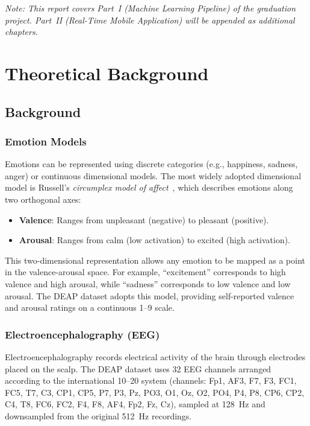 \documentclass[12pt,a4paper]{report}
\begin{document}
\noindent\textit{Note: This report covers Part~I (Machine Learning Pipeline)
of the graduation project. Part~II (Real-Time Mobile Application) will be
appended as additional chapters.}


\chapter{Theoretical Background}
\label{ch:background}

\section{Background}
\label{sec:bg}

\subsection{Emotion Models}

Emotions can be represented using discrete categories (e.g., happiness, sadness,
anger) or continuous dimensional models. The most widely adopted dimensional
model is Russell's \textit{circumplex model of affect}~\cite{russell1980}, which
describes emotions along two orthogonal axes:

\begin{itemize}[noitemsep]
    \item \textbf{Valence}: Ranges from unpleasant (negative) to pleasant
          (positive).
    \item \textbf{Arousal}: Ranges from calm (low activation) to excited
          (high activation).
\end{itemize}

This two-dimensional representation allows any emotion to be mapped as a point
in the valence-arousal space. For example, ``excitement'' corresponds to high
valence and high arousal, while ``sadness'' corresponds to low valence and low
arousal. The DEAP dataset adopts this model, providing self-reported valence
and arousal ratings on a continuous 1--9 scale.

\subsection{Electroencephalography (EEG)}

Electroencephalography records electrical activity of the brain through
electrodes placed on the scalp. The DEAP dataset uses 32 EEG channels arranged
according to the international 10--20 system (channels: Fp1, AF3, F7, F3, FC1,
FC5, T7, C3, CP1, CP5, P7, P3, Pz, PO3, O1, Oz, O2, PO4, P4, P8, CP6, CP2,
C4, T8, FC6, FC2, F4, F8, AF4, Fp2, Fz, Cz), sampled at 128~Hz and
downsampled from the original 512~Hz recordings.
\end{document}
